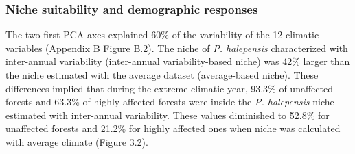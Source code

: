 \documentclass[11pt,twoside]{reedthesis}
\begin{document}
\subsubsection{Niche suitability and demographic
responses}\label{niche-suitability-and-demographic-responses}

The two first PCA axes explained 60\% of the variability of the 12
climatic variables (Appendix B Figure B.2). The niche of \emph{P.
halepensis} characterized with inter-annual variability (inter-annual
variability-based niche) was 42\% larger than the niche estimated with
the average dataset (average-based niche). These differences implied
that during the extreme climatic year, 93.3\% of unaffected forests and
63.3\% of highly affected forests were inside the \emph{P. halepensis}
niche estimated with inter-annual variability. These values diminished
to 52.8\% for unaffected forests and 21.2\% for highly affected ones
when niche was calculated with average climate (Figure 3.2).\par
\end{document}
